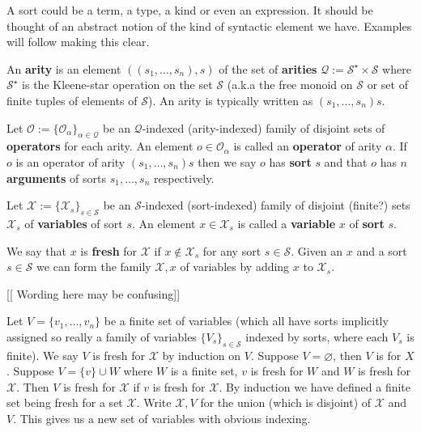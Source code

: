 A sort could be a term, a type, a kind or even an expression. It should be thought of an abstract notion of the kind of syntactic element we have. Examples will follow making this clear.

\begin{defin}[Arities]
    An \textbf{arity} is an element $((s_1,\dots,s_n),s)$ of the set of \textbf{arities} $\mathcal{Q}:=\mathcal{S}^\star \times \mathcal{S}$ where $\mathcal{S}^\star$ is the Kleene-star operation on the set $\mathcal{S}$ (a.k.a the free monoid on $\mathcal{S}$ or set of finite tuples of elements of $\mathcal{S}$). An arity is typically written as $(s_1,\dots,s_n)s$. 
\end{defin}

\begin{defin}[Operators]
    Let $\mathcal{O} :=\{ \mathcal{O}_\alpha \}_{\alpha \in \mathcal{Q}}$ be an $\mathcal{Q}$-indexed (arity-indexed) family of disjoint sets of \textbf{operators} for each arity. An element $o \in \mathcal{O}_\alpha$ is called an \textbf{operator} of arity $\alpha$. If $o$ is an operator of arity $(s_1,\dots,s_n)s$ then we say $o$ has \textbf{sort} $s$ and that $o$ has $n$ \textbf{arguments} of sorts $s_1,\dots,s_n$ respectively.
\end{defin}

\begin{defin}[Variables]
    Let $\mathcal{X}:= \{ \mathcal{X}_s\}_{s \in \mathcal{S}}$ be an $\mathcal{S}$-indexed (sort-indexed) family of disjoint (finite?) sets $\mathcal{X}_s$ of \textbf{variables} of sort $s$. An element $x\in\mathcal{X}_s$ is called a \textbf{variable} $x$ of \textbf{sort} $s$. 
\end{defin}

\begin{defin}
    We say that $x$ is \textbf{fresh} for $\mathcal{X}$ if $x \not\in \mathcal{X}_s$ for any sort $s\in \mathcal{S}$. Given an $x$ and a sort $s\in \mathcal{S}$ we can form the family $\mathcal{X},x$ of variables by adding $x$ to $\mathcal{X}_s$. 
\end{defin}


[[ Wording here may be confusing]]
\begin{defin}
    Let $V=\{ v_1 ,\dots, v_n\}$ be a finite set of variables (which all have sorts implicitly assigned so really a family of variables $\{V_s\}_{s\in\mathcal{S}}$ indexed by sorts, where each $V_s$ is finite). We say $V$ is fresh for $\mathcal{X}$ by induction on $V$. Suppose $V=\varnothing$, then $V$ is  for $X$. Suppose $V = \{v \} \cup W$ where $W$ is a finite set, $v$ is fresh for $W$ and $W$ is fresh for $\mathcal{X}$. Then $V$ is fresh for $\mathcal{X}$ if $v$ is fresh for $\mathcal{X}$. By induction we have defined a finite set being fresh for a set $\mathcal{X}$. Write $\mathcal{X},V$ for the union (which is disjoint) of $\mathcal{X}$ and $V$. This gives us a new set of variables with obvious indexing.
\end{defin}

